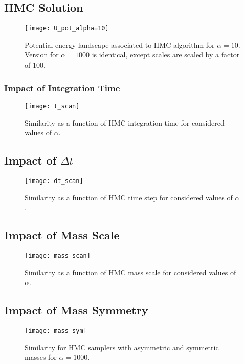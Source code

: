 \documentclass[a4paper, 12pt,oneside]{article}
\begin{document}
		\subsection{HMC Solution}
		\begin{wrapfigure}[18]{r}{0.6\textwidth}
			\centering
				\vspace{-2em}
				\texttt{[image: U\_pot\_alpha=10]}
				\caption{Potential energy landscape associated to HMC algorithm for $\alpha=10$. Version for $\alpha=1000$ is identical, except scales are scaled by a factor of 100.}
				\label{fig:U-pot-alpha=10}
		\end{wrapfigure}
		\lipsum[1]
			\subsubsection{Impact of Integration Time}
			\begin{figure}[htb]
				\centering
					\vspace{0em}
					\texttt{[image: t\_scan]}
					\caption{Similarity as a function of HMC integration time for considered values of $\alpha$.}
					\label{fig:t-scan}
			\end{figure}
			\lipsum[1]
			\subsection{Impact of $\Delta t$}
			\begin{figure}[htb]
				\centering
					\vspace{0em}
					\texttt{[image: dt\_scan]}
					\caption{Similarity as a function of HMC time step for considered values of $\alpha$.}
					\label{fig:dt-scan}
			\end{figure}
			\lipsum[1]
			\subsection{Impact of Mass Scale}
			\begin{figure}[htb]
				\centering
					\vspace{0em}
					\texttt{[image: mass\_scan]}
					\caption{Similarity as a function of HMC mass scale for considered values of $\alpha$.}
					\label{fig:mass-scan}
			\end{figure}
			\lipsum[1]
			\subsection{Impact of Mass Symmetry}
			\begin{figure}[htb]
				\centering
					\vspace{0em}
					\texttt{[image: mass\_sym]}
					\caption{Similarity for HMC samplers with asymmetric and symmetric masses for $\alpha=1000$.}
					\label{fig:mass-sym}
			\end{figure}
			\lipsum[1]
\end{document}
